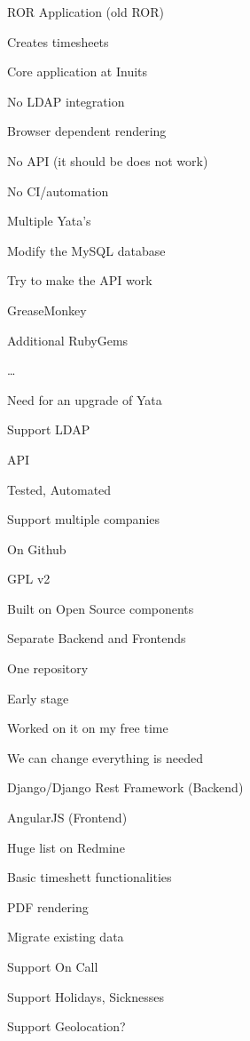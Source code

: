 \titleSlide


\inuitsSlide


\begin{iframe}[Yata]
\item ROR Application (old ROR)
\item Creates timesheets
\item Core application at Inuits
\end{iframe}
\begin{iframe}
\item No LDAP integration
\item Browser dependent rendering
\item No API (it should be does not work)
\item No CI/automation
\item Multiple Yata's
\end{iframe}
\begin{iframe}
\item Modify the MySQL database
\item Try to make the API work
\item GreaseMonkey
\item Additional RubyGems
\item \dots
\end{iframe}
\begin{iframe}[YaYaTa]
\item Need for an upgrade of Yata
\item Support LDAP
\item API
\item Tested, Automated
\item Support multiple companies
\end{iframe}
\begin{iframe}
\item On Github
\item GPL v2
\item Built on Open Source components
\item Separate Backend and Frontends
\item One repository
\end{iframe}
\begin{iframe}
\item Early stage
\item Worked on it on my free time
\item We can change everything is needed
\item Django/Django Rest Framework (Backend)
\item AngularJS (Frontend)
\end{iframe}
\begin{iframe}[TODO]
\item Huge list on Redmine
\item Basic timeshett functionalities
\item PDF rendering
\item Migrate existing data
\item Support On Call
\item Support Holidays, Sicknesses
\item Support Geolocation?
\end{iframe}
